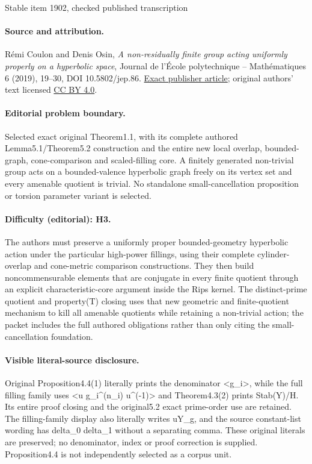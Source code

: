 \documentclass[11pt]{article}
\theoremstyle{definition}
\theoremstyle{remark}
\begin{document}
\begin{center}{\Large Stable item 1902, checked published transcription}\end{center}
\paragraph{Source and attribution.}
Rémi Coulon and Denis Osin, \emph{A non-residually finite group acting uniformly properly on a hyperbolic space}, Journal de l’École polytechnique -- Mathématiques 6 (2019), 19--30, DOI 10.5802/jep.86. \href{https://jep.centre-mersenne.org/articles/10.5802/jep.86/}{Exact publisher article}; original authors' text licensed \href{https://creativecommons.org/licenses/by/4.0/}{CC BY 4.0}.
\paragraph{Editorial problem boundary.}
Selected exact original Theorem1.1, with its complete authored Lemma5.1/Theorem5.2 construction and the entire new local overlap, bounded-graph, cone-comparison and scaled-filling core. A finitely generated non-trivial group acts on a bounded-valence hyperbolic graph freely on its vertex set and every amenable quotient is trivial. No standalone small-cancellation proposition or torsion parameter variant is selected.
\paragraph{Difficulty (editorial): H3.}
The authors must preserve a uniformly proper bounded-geometry hyperbolic action under the particular high-power fillings, using their complete cylinder-overlap and cone-metric comparison constructions. They then build noncommensurable elements that are conjugate in every finite quotient through an explicit characteristic-core argument inside the Rips kernel. The distinct-prime quotient and property(T) closing uses that new geometric and finite-quotient mechanism to kill all amenable quotients while retaining a non-trivial action; the packet includes the full authored obligations rather than only citing the small-cancellation foundation.
\paragraph{Visible literal-source disclosure.}
Original Proposition4.4(1) literally prints the denominator <g\_i>, while the full filling family uses <u g\_i\textasciicircum{}(n\_i) u\textasciicircum{}(-1)> and Theorem4.3(2) prints Stab(Y)/H. Its entire proof closing and the original5.2 exact prime-order use are retained. The filling-family display also literally writes uY\_g, and the source constant-list wording has delta\_0 delta\_1 without a separating comma. These original literals are preserved; no denominator, index or proof correction is supplied. Proposition4.4 is not independently selected as a corpus unit.
\end{document}
